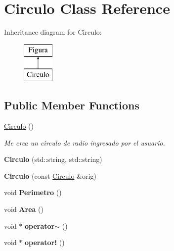 \hypertarget{class_circulo}{}\section{Circulo Class Reference}
\label{class_circulo}
Inheritance diagram for Circulo\+:\begin{figure}[H]
\begin{center}
\leavevmode
\includegraphics[height=2.000000cm]{class_circulo}
\end{center}
\end{figure}
\subsection*{Public Member Functions}
\begin{DoxyCompactItemize}
\item 
\hyperlink{class_circulo_a6933bf908b78a4167684081a3a8f257f}{Circulo} ()
\begin{DoxyCompactList}\small\item\em Me crea un circulo de radio ingresado por el usuario. \end{DoxyCompactList}\item 
{\bfseries Circulo} (std\+::string, std\+::string)\hypertarget{class_circulo_a966fa56f9f5262ebf4e33cbc094d07fd}{}\label{class_circulo_a966fa56f9f5262ebf4e33cbc094d07fd}

\item 
{\bfseries Circulo} (const \hyperlink{class_circulo}{Circulo} \&orig)\hypertarget{class_circulo_aa1ceac8b166daa79997baa338d6e37e5}{}\label{class_circulo_aa1ceac8b166daa79997baa338d6e37e5}

\item 
void {\bfseries Perimetro} ()\hypertarget{class_circulo_a4934591a9fffcc715527d45cd5035659}{}\label{class_circulo_a4934591a9fffcc715527d45cd5035659}

\item 
void {\bfseries Area} ()\hypertarget{class_circulo_a0796f73bbd8bf3206aa42222b243834f}{}\label{class_circulo_a0796f73bbd8bf3206aa42222b243834f}

\item 
void $\ast$ {\bfseries operator$\sim$} ()\hypertarget{class_circulo_a26b808c14a5bd66b12a7ebaa1dccf32c}{}\label{class_circulo_a26b808c14a5bd66b12a7ebaa1dccf32c}

\item 
void $\ast$ {\bfseries operator!} ()\hypertarget{class_circulo_a016704759e06464cc0413aaeb955cdd8}{}\label{class_circulo_a016704759e06464cc0413aaeb955cdd8}

\end{DoxyCompactItemize}
